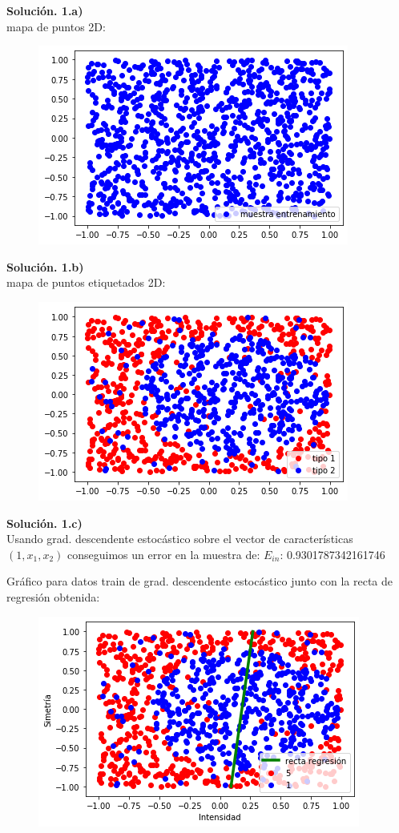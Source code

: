 \documentclass[a4paper,11pt]{article}
\begin{document}
\textbf{Solución. 1.a)} \\
mapa de puntos 2D:
\begin{figure}[h]
\includegraphics[scale=0.5]{grafica1ej2.21a}
\centering
\end{figure}

\textbf{Solución. 1.b)} \\
mapa de puntos etiquetados 2D:
\begin{figure}[h]
\includegraphics[scale=0.5]{grafica1ej2.21b}
\centering
\end{figure}

\textbf{Solución. 1.c)} \\
Usando grad. descendente estocástico sobre el vector de características $(1,x_1,x_2)$ conseguimos un error en la muestra de: $E_{in}$:  0.9301787342161746

Gráfico para datos train de grad. descendente estocástico junto con la recta de regresión obtenida:

\begin{figure}[h]
\includegraphics[scale=0.5]{grafica1ej2.21c}
\centering
\end{figure}
\end{document}
